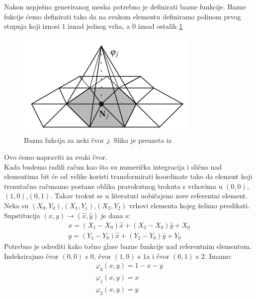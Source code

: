 \documentclass[zavrsnirad]{../fer}
\begin{document}
Nakon uspješno generiranog mesha potrebno je definirati
bazne funkcije. Bazne fukcije ćemo definirati tako da
na svakom elementu definiramo polinom prvog stupnja koji
iznosi $1$ iznad jednog vrha, a $0$ iznad ostalih \ref{baznaFja}
\begin{figure}[htb]
	\centering
	\includegraphics[width=0.5\linewidth]{Figures/baznaFja.png}
  \caption{Bazna fukcija za neki čvor $j$. Slika je preuzeta iz \cite{Quarteroni}}
	\label{baznaFja}
\end{figure}
Ovo ćemo napraviti za svaki čvor. 
\bigskip
\\ 
Kada budemo radili račun kao što su numerička integracija i 
slično nad elementima bit će od velike koristi transformirati
koordinate tako da element koji trenutačno računamo postane 
oblika pravokutnog trokuta s vrhovima u $(0,0)$,$(1,0)$,$(0,1)$. 
Takav trokut se u literaturi uobičajeno zove referentni element.
Neka su $(X_0, Y_0)$,$(X_1, Y_1)$,$(X_2, Y_2)$ vrhovi elementa
kojeg želimo preslikati. Supstitucija $(x, y) \rightarrow (\hat x, \hat y)$
je dana s:
\begin{align}
  x = (X_1 - X_0)\hat x + (X_2 - X_0)\hat y + X_0 \\ 
  y = (Y_1 - Y_0)\hat x +(Y_2 - Y_0) \hat y + Y_0
\end{align}
Potrebno je odrediti kako točno glase bazne funkcije nad 
referentnim elementom.
Indeksirajmo čvor $(0,0)$ s $0$, čvor $(1,0)$ s $1$a i 
čvor $(0, 1)$ s $2$.
Imamo:
\begin{align}
\varphi_0(x,y) = 1 - x - y\\
\varphi_1(x,y) = x\\
\varphi_2(x,y) = y
\end{align}
\newpage
\end{document}
